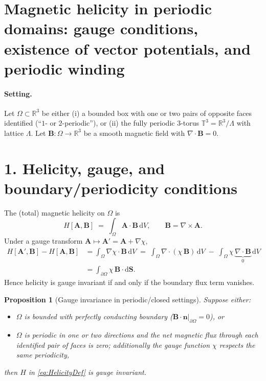 \documentclass[11pt]{article}
\newtheorem{prop}{Proposition}
\renewcommand{\div}{\nabla\!\cdot\!}
\newcommand{\curl}{\nabla\!\times\!}
\newcommand{\bbR}{\mathbb{R}}
\newcommand{\bbT}{\mathbb{T}}
\begin{document}
\section*{Magnetic helicity in periodic domains: gauge conditions, existence of vector potentials, and periodic winding}

    \paragraph{Setting.}
        Let $\Omega\subset\bbR^3$ be either (i) a bounded box with one or two pairs of opposite faces identified (``$1$- or $2$-periodic''), or (ii) the fully periodic $3$-torus $\bbT^3 = \bbR^3/\Lambda$ with lattice $\Lambda$. Let $\bm{B}:\Omega\to\bbR^3$ be a smooth magnetic field with $\div\bm{B}=0$.

\section*{1. Helicity, gauge, and boundary/periodicity conditions}

The (total) magnetic helicity on $\Omega$ is
\begin{equation}
H[\bm{A},\bm{B}] \;=\; \int_{\Omega} \bm{A}\cdot\bm{B}\, \mathrm{d}V,
\qquad \bm{B}=\curl\bm{A}.
\label{eq:HelicityDef}
\end{equation}
Under a gauge transform $\bm{A}\mapsto \bm{A}'=\bm{A}+\nabla\chi$,
\begin{align}
H[\bm{A}',\bm{B}] - H[\bm{A},\bm{B}]
&= \int_{\Omega} \nabla\chi \cdot \bm{B}\, \mathrm{d}V
\;=\; \int_{\Omega} \div(\chi\,\bm{B})\, \mathrm{d}V
\;-\; \int_{\Omega} \chi\,\underbrace{\div\bm{B}}_{0}\,\mathrm{d}V \nonumber\\
&= \int_{\partial\Omega} \chi\, \bm{B}\cdot \mathrm{d}\bm{S}.
\label{eq:GaugeShift}
\end{align}
\noindent Hence helicity is gauge invariant if and only if the boundary flux term vanishes.

\begin{prop}[Gauge invariance in periodic/closed settings]
\label{prop:gauge-invariance}
Suppose either:
\begin{itemize}
\item[(a)] $\Omega$ is bounded with perfectly conducting boundary ($\bm{B}\cdot \bm{n}|_{\partial\Omega}=0$), or
\item[(b)] $\Omega$ is periodic in one or two directions and the \emph{net magnetic flux} through each identified pair of faces is zero; additionally the gauge function $\chi$ respects the same periodicity,
\end{itemize}
then $H$ in \eqref{eq:HelicityDef} is gauge invariant.
\end{prop}
\end{document}
